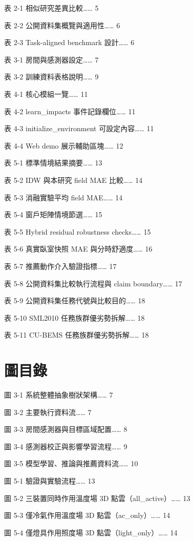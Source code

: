 \documentclass[12pt,a4paper]{article}
\begin{document}
表 2-1 相似研究差異比較…… 5


表 2-2 公開資料集概覽與適用性…… 6


表 2-3 Task-aligned benchmark 設計…… 6


表 3-1 房間與感測器設定…… 7


表 3-2 訓練資料表格說明…… 9


表 4-1 核心模組一覽…… 11


表 4-2 learn\_\allowbreak{}impacts 事件記錄欄位…… 11


表 4-3 initialize\_\allowbreak{}environment 可設定內容…… 11


表 4-4 Web demo 展示輔助區塊…… 12


表 5-1 標準情境結果摘要…… 13


表 5-2 IDW 與本研究 field MAE 比較…… 14


表 5-3 消融實驗平均 field MAE…… 14


表 5-4 窗戶矩陣情境節選…… 15


表 5-5 Hybrid residual robustness checks…… 15


表 5-6 真實臥室快照 MAE 與分時舒適度…… 16


表 5-7 推薦動作介入驗證指標…… 17


表 5-8 公開資料集比較執行流程與 claim boundary…… 17


表 5-9 公開資料集任務代號與比較目的…… 18


表 5-10 SML2010 任務族群優劣勢拆解…… 18


表 5-11 CU-BEMS 任務族群優劣勢拆解…… 18


\clearpage

\section*{圖目錄}

圖 3-1 系統整體抽象樹狀架構…… 7


圖 3-2 主要執行資料流…… 7


圖 3-3 房間感測器與目標區域配置…… 8


圖 3-4 感測器校正與影響學習流程…… 9


圖 3-5 模型學習、推論與推薦資料流…… 10


圖 5-1 驗證與實驗流程…… 13


圖 5-2 三裝置同時作用溫度場 3D 點雲（all\_\allowbreak{}active）…… 13


圖 5-3 僅冷氣作用溫度場 3D 點雲（ac\_\allowbreak{}only）…… 14


圖 5-4 僅燈具作用照度場 3D 點雲（light\_\allowbreak{}only）…… 14
\end{document}
